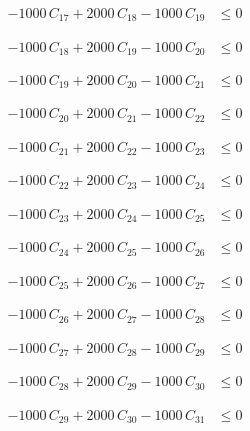 \documentclass[a4paper,11pt]{article}
\begin{document}
\begin{align}
-1000\,C_{17} + 2000\,C_{18} - 1000\,C_{19} &\leq 0 \nonumber
\end{align}

\begin{align}
-1000\,C_{18} + 2000\,C_{19} - 1000\,C_{20} &\leq 0 \nonumber
\end{align}

\begin{align}
-1000\,C_{19} + 2000\,C_{20} - 1000\,C_{21} &\leq 0 \nonumber
\end{align}

\begin{align}
-1000\,C_{20} + 2000\,C_{21} - 1000\,C_{22} &\leq 0 \nonumber
\end{align}

\begin{align}
-1000\,C_{21} + 2000\,C_{22} - 1000\,C_{23} &\leq 0 \nonumber
\end{align}

\begin{align}
-1000\,C_{22} + 2000\,C_{23} - 1000\,C_{24} &\leq 0 \nonumber
\end{align}

\begin{align}
-1000\,C_{23} + 2000\,C_{24} - 1000\,C_{25} &\leq 0 \nonumber
\end{align}

\begin{align}
-1000\,C_{24} + 2000\,C_{25} - 1000\,C_{26} &\leq 0 \nonumber
\end{align}

\begin{align}
-1000\,C_{25} + 2000\,C_{26} - 1000\,C_{27} &\leq 0 \nonumber
\end{align}

\begin{align}
-1000\,C_{26} + 2000\,C_{27} - 1000\,C_{28} &\leq 0 \nonumber
\end{align}

\begin{align}
-1000\,C_{27} + 2000\,C_{28} - 1000\,C_{29} &\leq 0 \nonumber
\end{align}

\begin{align}
-1000\,C_{28} + 2000\,C_{29} - 1000\,C_{30} &\leq 0 \nonumber
\end{align}

\begin{align}
-1000\,C_{29} + 2000\,C_{30} - 1000\,C_{31} &\leq 0 \nonumber
\end{align}
\end{document}
